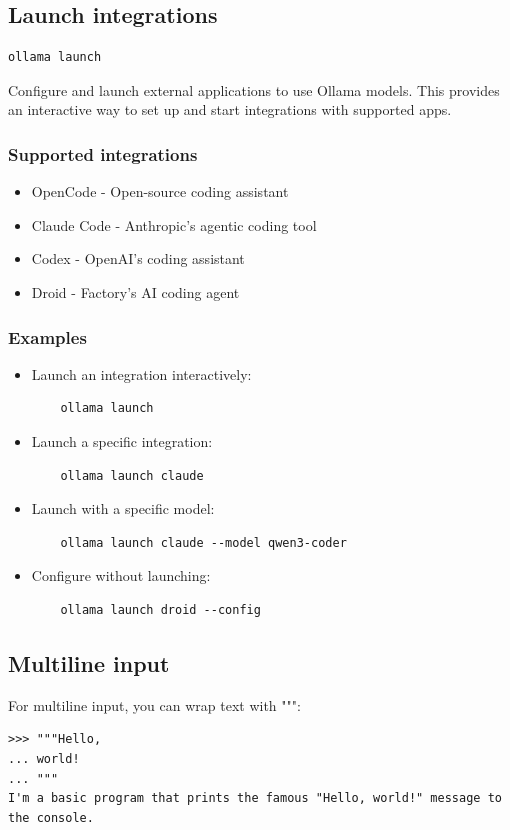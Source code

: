 \documentclass[12pt,UTF8]{ctexbook}
\begin{document}
\subsection{Launch integrations}
\begin{verbatim}
ollama launch
\end{verbatim}

Configure and launch external applications to use Ollama models. This provides an interactive way to set up and start integrations with supported apps.

\subsubsection{Supported integrations}
\begin{itemize}
  \item OpenCode - Open-source coding assistant
  \item Claude Code - Anthropic's agentic coding tool
  \item Codex - OpenAI's coding assistant
  \item Droid - Factory's AI coding agent
\end{itemize}

\subsubsection{Examples}
\begin{itemize}
  \item Launch an integration interactively: 
    \begin{verbatim}
    ollama launch
    \end{verbatim}
  \item Launch a specific integration: 
    \begin{verbatim}
    ollama launch claude
    \end{verbatim}
  \item Launch with a specific model: 
    \begin{verbatim}
    ollama launch claude --model qwen3-coder
    \end{verbatim}
  \item Configure without launching: 
    \begin{verbatim}
    ollama launch droid --config
    \end{verbatim}
\end{itemize}

\subsection{Multiline input}
For multiline input, you can wrap text with """:
\begin{verbatim}
>>> """Hello,
... world!
... """
I'm a basic program that prints the famous "Hello, world!" message to the console.
\end{verbatim}
\end{document}
